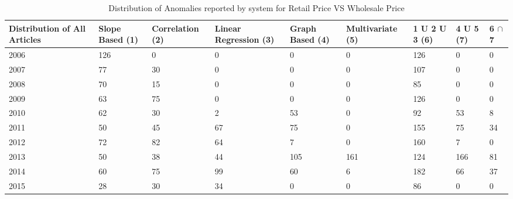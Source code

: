 \documentclass[a4paper,10pt]{report}
\begin{document}
	
	\begin{table}[]
	\centering
	\resizebox{\textwidth}{!}
	{\begin{tabular}{|l|l|l|l|l|l|l|l|l|}
	\hline
	Distribution of All Articles & Slope Based (1) & Correlation (2) & Linear Regression (3) & Graph Based (4) & Multivariate (5) & 1 U 2 U 3 (6) & 4 U 5 (7) & 6 $\cap$ 7  \\
	\hline
	2006 & 126 & 0  & 0  & 0   & 0   & 126 & 0   & 0  \\
	\hline
	2007 & 77  & 30 & 0  & 0   & 0   & 107 & 0   & 0  \\
	\hline
	2008 & 70  & 15 & 0  & 0   & 0   & 85  & 0   & 0  \\
	\hline
	2009 & 63  & 75 & 0  & 0   & 0   & 126 & 0   & 0  \\
	\hline
	2010 & 62  & 30 & 2  & 53  & 0   & 92  & 53  & 8  \\
	\hline
	2011 & 50  & 45 & 67 & 75  & 0   & 155 & 75  & 34 \\
	\hline
	2012 & 72  & 82 & 64 & 7   & 0   & 160 & 7   & 0  \\
	\hline
	2013 & 50  & 38 & 44 & 105 & 161 & 124 & 166 & 81 \\
	\hline
	2014 & 60  & 75 & 99 & 60  & 6   & 182 & 66  & 37 \\
	\hline
	2015 & 28  & 30 & 34 & 0   & 0   & 86  & 0   & 0  \\
	\hline
	\end{tabular}}
	\caption{Distribution of Anomalies reported by system for Retail Price VS Wholesale Price }
	\label{RetailVsWholesaleDist}
	\end{table}
	
\end{document}
